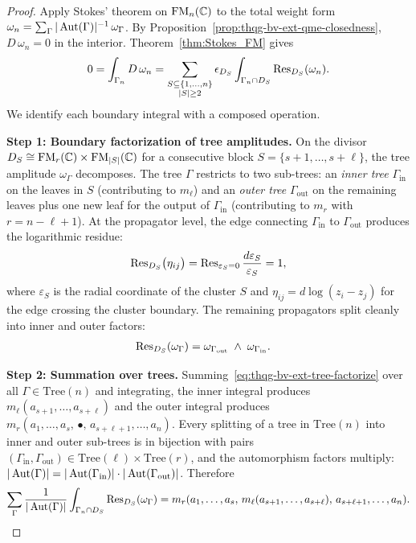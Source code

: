 \begin{proof}
Apply Stokes' theorem on $\operatorname{FM}_n(\mathbb{C})$ to the total weight form
$\omega_n = \sum_\Gamma |\operatorname{Aut}(\Gamma)|^{-1}\,\omega_\Gamma$.
By Proposition~\ref{prop:thqg-bv-ext-qme-closedness},
$D\,\omega_n = 0$ in the interior.
Theorem~\ref{thm:Stokes_FM} gives
\[
0 = \int_{\Gamma_n} D\,\omega_n
= \sum_{\substack{S \subseteq \{1,\ldots,n\} \\ |S| \ge 2}}
\epsilon_{D_S}
\int_{\Gamma_n \cap D_S} \operatorname{Res}_{D_S}(\omega_n).
\]
We identify each boundary integral with a composed operation.

\medskip\noindent\textbf{Step 1: Boundary factorization of
tree amplitudes.}
On the divisor $D_S \cong \operatorname{FM}_r(\mathbb{C}) \times \operatorname{FM}_{|S|}(\mathbb{C})$
for a consecutive block $S = \{s+1, \ldots, s+\ell\}$, the
tree amplitude $\omega_\Gamma$ decomposes. The tree $\Gamma$
restricts to two sub-trees: an \emph{inner tree} $\Gamma_{\mathrm{in}}$
on the leaves in $S$ (contributing to $m_\ell$) and an \emph{outer
tree} $\Gamma_{\mathrm{out}}$ on the remaining leaves plus one new
leaf for the output of $\Gamma_{\mathrm{in}}$ (contributing to
$m_r$ with $r = n - \ell + 1$). At the propagator level, the
edge connecting $\Gamma_{\mathrm{in}}$ to $\Gamma_{\mathrm{out}}$
produces the logarithmic residue:
\[
\operatorname{Res}_{D_S}\bigl(\eta_{ij}\bigr)
= \operatorname{Res}_{\varepsilon_S = 0}
 \frac{d\varepsilon_S}{\varepsilon_S} = 1,
\]
where $\varepsilon_S$ is the radial coordinate of the cluster $S$
and $\eta_{ij} = d\log(z_i - z_j)$ for the edge crossing the
cluster boundary. The remaining propagators split cleanly into
inner and outer factors:
\begin{align}
\operatorname{Res}_{D_S}(\omega_\Gamma)
&= \omega_{\Gamma_{\mathrm{out}}}
 \;\wedge\; \omega_{\Gamma_{\mathrm{in}}}.
\end{align}

\medskip\noindent\textbf{Step 2: Summation over trees.}
Summing~\eqref{eq:thqg-bv-ext-tree-factorize} over all
$\Gamma \in \mathrm{Tree}(n)$ and integrating, the inner
integral produces $m_\ell(a_{s+1}, \ldots, a_{s+\ell})$ and
the outer integral produces
$m_r(a_1, \ldots, a_s,\, \bullet,\, a_{s+\ell+1}, \ldots, a_n)$.
Every splitting of a tree in $\mathrm{Tree}(n)$ into inner and
outer sub-trees is in bijection with pairs
$(\Gamma_{\mathrm{in}}, \Gamma_{\mathrm{out}}) \in
\mathrm{Tree}(\ell) \times \mathrm{Tree}(r)$, and the
automorphism factors multiply:
$|\operatorname{Aut}(\Gamma)| = |\operatorname{Aut}(\Gamma_{\mathrm{in}})| \cdot
|\operatorname{Aut}(\Gamma_{\mathrm{out}})|$.
Therefore
\[
\sum_\Gamma \frac{1}{|\operatorname{Aut}(\Gamma)|}
\int_{\Gamma_n \cap D_S} \operatorname{Res}_{D_S}(\omega_\Gamma)
= m_r(a_1, \ldots, a_s,\,
 m_\ell(a_{s+1}, \ldots, a_{s+\ell}),\,
 a_{s+\ell+1}, \ldots, a_n).
\]


\end{proof}
